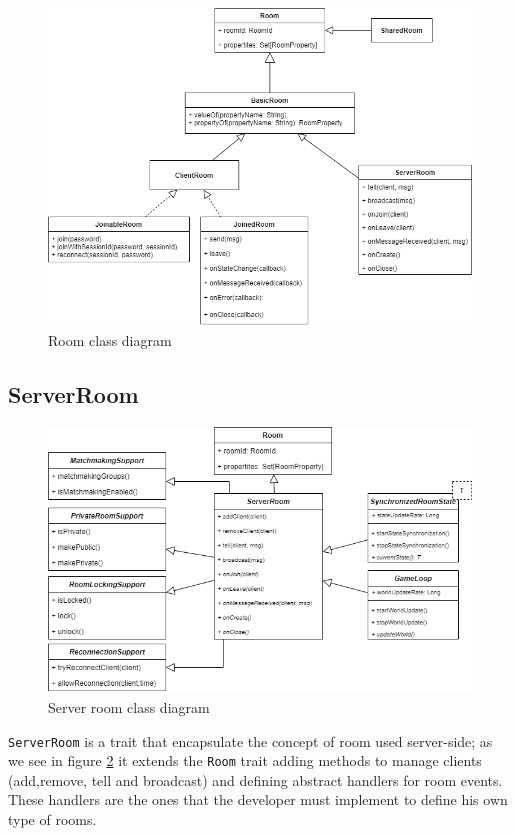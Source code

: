 \begin{figure}
	\centering
	\includegraphics[scale=0.5]{images/4-design/room-class.png}
	\caption{Room class diagram}
	\label{fig:room_class_diagram}
\end{figure}

\subsection{ServerRoom}
\begin{figure}
	\centering
	\includegraphics[scale=0.5]{images/4-design/server-room.png}
	\caption{Server room class diagram}
	\label{fig:server_room_class_diagram}
\end{figure}
\texttt{ServerRoom} is a trait that encapsulate the concept of room used server-side; as we see in figure \ref{fig:server_room_class_diagram} it extends the \texttt{Room} trait adding methods to manage clients (add,remove, tell and broadcast) and defining abstract handlers for room events. These handlers are the ones that the developer must implement to define his own type of rooms.

